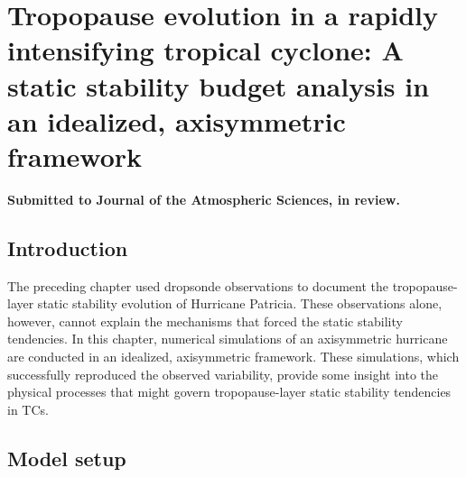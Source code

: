  
\chapter{Tropopause evolution in a rapidly intensifying tropical cyclone: A static stability budget analysis in an idealized, axisymmetric framework}
\resetfootnote %

\textbf{Submitted to Journal of the Atmospheric Sciences, in review.}

\section{Introduction}

The preceding chapter used dropsonde observations to document the tropopause-layer static stability evolution of Hurricane Patricia.
These observations alone, however, cannot explain the mechanisms that forced the static stability tendencies.
In this chapter, numerical simulations of an axisymmetric hurricane are conducted in an idealized, axisymmetric framework.
These simulations, which successfully reproduced the observed variability, provide some insight into the physical processes that might govern tropopause-layer static stability tendencies in TCs.

\section{Model setup}

